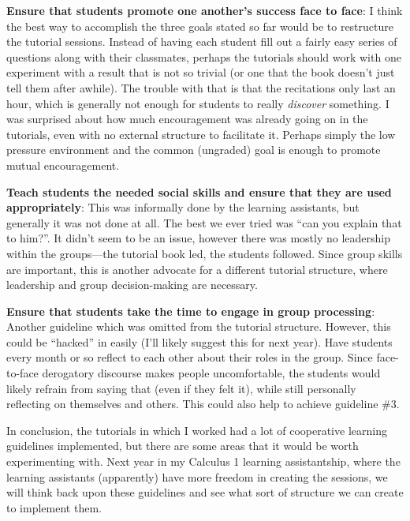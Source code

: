 \documentclass[12pt]{article}
\begin{document}
\textbf{Ensure that students promote one another's success face to
face}:  I think the best way to accomplish the three goals stated so far
would be to restructure the tutorial sessions.  Instead of having each
student fill out a fairly easy series of questions along with their
classmates, perhaps the tutorials should work with one experiment with a
result that is not so trivial (or one that the book doesn't just tell
them after awhile).  The trouble with that is that the recitations only
last an hour, which is generally not enough for students to really
\textit{discover} something.  I was surprised about how much
encouragement was already going on in the tutorials, even with no
external structure to facilitate it.  Perhaps simply the low pressure
environment and the common (ungraded) goal is enough to promote mutual
encouragement.

\textbf{Teach students the needed social skills and ensure that they are
used appropriately}:  This was informally done by the learning
assistants, but generally it was not done at all.  The best we ever
tried was ``can you explain that to him?''.  It didn't seem to be an
issue, however there was mostly no leadership within the groups---the
tutorial book led, the students followed.  Since group skills are
important, this is another advocate for a different tutorial structure,
where leadership and group decision-making are necessary.

\textbf{Ensure that students take the time to engage in group
processing}: Another guideline which was omitted from the tutorial
structure.  However, this could be ``hacked'' in easily (I'll likely
suggest this for next year).  Have students every month or so reflect to
each other about their roles in the group.  Since face-to-face
derogatory discourse makes people uncomfortable, the students would
likely refrain from saying that (even if they felt it), while still
personally reflecting on themselves and others.  This could also help to
achieve guideline \#3.

In conclusion, the tutorials in which I worked had a lot of cooperative
learning guidelines implemented, but there are some areas that it would
be worth experimenting with.  Next year in my Calculus 1 learning
assistantship, where the learning assistants (apparently) have more
freedom in creating the sessions, we will think back upon these
guidelines and see what sort of structure we can create to implement
them.
\end{document}
